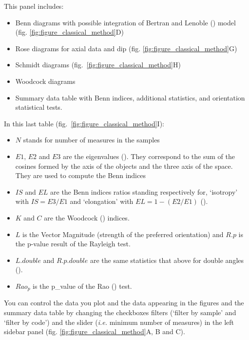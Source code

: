 \documentclass[
]{article}
\providecommand{\tightlist}{%
  \setlength{\itemsep}{0pt}\setlength{\parskip}{0pt}}
\begin{document}
This panel includes:

\begin{itemize}
\tightlist
\item
  Benn diagrams with possible integration of Bertran and Lenoble
  () model (fig.
  \ref{fig:figure_classical_method}D)
\item
  Rose diagrams for axial data and dip (fig.
  \ref{fig:figure_classical_method}G)
\item
  Schmidt diagrams (fig.~\ref{fig:figure_classical_method}H)
\item
  Woodcock diagrams
\item
  Summary data table with Benn indices, additional statistics, and
  orientation statistical tests.
\end{itemize}

In this last table (fig.~\ref{fig:figure_classical_method}I):

\begin{itemize}
\tightlist
\item
  \(N\) stands for number of measures in the samples
\item
  \(E1\), \(E2\) and \(E3\) are the eigenvalues
  (). They correspond to the sum
  of the cosines formed by the axis of the objects and the three axis of
  the space. They are used to compute the Benn indices
\item
  \(IS\) and \(EL\) are the Benn indices ratios standing respectively
  for, `isotropy' with \(IS = E3/E1\) and `elongation' with
  \(EL = 1-(E2/E1)\) ().
\item
  \(K\) and \(C\) are the Woodcock ()
  indices.
\item
  \(L\) is the Vector Magnitude (strength of the preferred orientation)
  and \(R.p\) is the p-value result of the Rayleigh test.
\item
  \(L.double\) and \(R.p.double\) are the same statistics that above for
  double angles ().
\item
  \(Rao_p\) is the p\_value of the Rao
  () test.
\end{itemize}

You can control the data you plot and the data appearing in the figures
and the summary data table by changing the checkboxes filters (`filter
by sample' and `filter by code') and the slider (\emph{i.e.} minimum
number of measures) in the left sidebar panel (fig.
\ref{fig:figure_classical_method}A, B and C).
\end{document}
